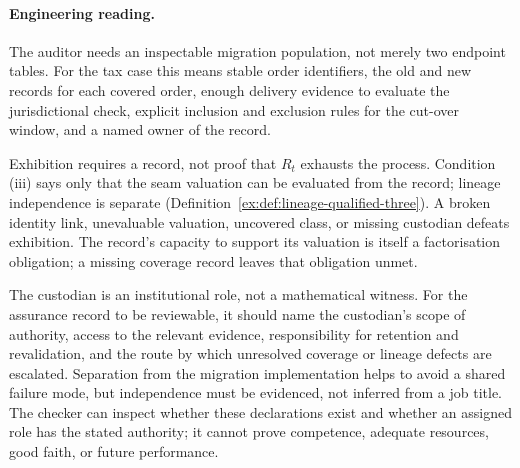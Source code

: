 \documentclass[smallextended,envcountsect,envcountsame,natbib]{svjour3}
\begin{document}
\paragraph{Engineering reading.} The auditor needs an inspectable migration population, not merely two endpoint tables. For the tax case this means stable order identifiers, the old and new records for each covered order, enough delivery evidence to evaluate the jurisdictional check, explicit inclusion and exclusion rules for the cut-over window, and a named owner of the record.

Exhibition requires a record, not proof that $R_t$ exhausts the process. Condition (iii) says only that the seam valuation can be evaluated from the record; lineage independence is separate (Definition~\ref{ex:def:lineage-qualified-three}). A broken identity link, unevaluable valuation, uncovered class, or missing custodian defeats exhibition. The record's capacity to support its valuation is itself a factorisation obligation; a missing coverage record leaves that obligation unmet.

The custodian is an institutional role, not a mathematical witness. For the assurance record to be reviewable, it should name the custodian's scope of authority, access to the relevant evidence, responsibility for retention and revalidation, and the route by which unresolved coverage or lineage defects are escalated. Separation from the migration implementation helps to avoid a shared failure mode, but independence must be evidenced, not inferred from a job title. The checker can inspect whether these declarations exist and whether an assigned role has the stated authority; it cannot prove competence, adequate resources, good faith, or future performance.
\end{document}
